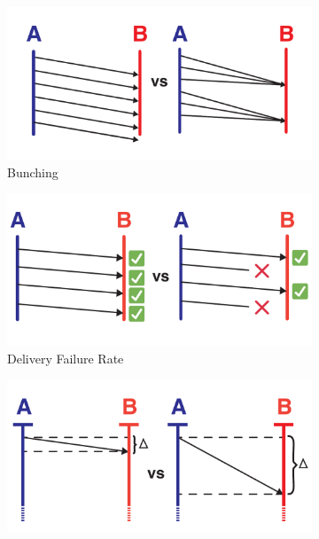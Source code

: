 \begin{figure}
  \centering
  \begin{subfigure}[b]{0.5\textwidth}
    \centering
    \includegraphics[width=\linewidth]{img/quality-of-service-metric-definitions/clumpiness.pdf}
    \caption{Bunching}
    \label{fig:quality-of-service-metric-definitions-clumpiness}
  \end{subfigure}%
  \begin{subfigure}[b]{0.5\textwidth}
    \centering
    \includegraphics[width=\linewidth]{img/quality-of-service-metric-definitions/delivery-failure-rate.pdf}
    \caption{Delivery Failure Rate}
    \label{fig:quality-of-service-metric-definitions-delivery-failure-rate}
  \end{subfigure}
  \begin{subfigure}[b]{0.5\textwidth}
    \centering
    \includegraphics[width=\linewidth]{img/quality-of-service-metric-definitions/latency.pdf}

\end{subfigure}
\end{figure}
